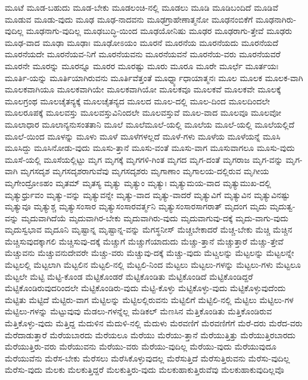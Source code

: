 {ಮೂಟೆ
ಮೂಡ-ಬಹುದು
ಮೂಡ-ಬೇಕು
ಮೂಡಲಂಚಿ-ನಲ್ಲಿ
ಮೂಡಲು
ಮೂಡಿ
ಮೂಡಿಬಂದಿದೆ
ಮೂಡಿವೆ
ಮೂಡುವ
ಮೂಡು-ವುದು
ಮೂಢ
ಮೂಢ-ನಾದವನು
ಮೂಢಗ್ರಾಹೇಣಾತ್ಮನೋ
ಮೂಢನಂಬಿಕೆಗೆ
ಮೂಢನಾಗಿರು-ವುದಿಲ್ಲ
ಮೂಢನಾಗು-ವುದಿಲ್ಲ
ಮೂಢಬುದ್ಧಿ-ಯಿಂದ
ಮೂಢಯೋನಿಷು
ಮೂಢರ
ಮೂಢರಾಗು-ತ್ತೇವೆ
ಮೂಢರು
ಮೂಢ-ವಾದ
ಮೂಢಾ
ಮೂಢಾಃ
ಮೂಢೋಽಯಂ
ಮೂರನೆ
ಮೂರನೆಯ
ಮೂರನೆಯದು
ಮೂರನೆಯದೆ
ಮೂರನೆಯದೇ
ಮೂರನೆಯವ-ನಿಗೆ
ಮೂರನೆಯವನು
ಮೂರನೆಯವನೆ
ಮೂರನೆಯ-ವರು
ಮೂರನೆಯವರೆ
ಮೂರನೇ
ಮೂರನ್ನು
ಮೂರನ್ನೂ
ಮೂರರ
ಮೂರಷ್ಟು
ಮೂರು
ಮೂರೂ
ಮೂರೇ
ಮೂರ್ಛೆ
ಮೂರ್ತಯಃ
ಮೂರ್ತಿ-ಯನ್ನು
ಮೂರ್ತಿಯಾಗಿರುವನು
ಮೂರ್ತಿವೆತ್ತಂತೆ
ಮೂರ್ಧ್ನ್ಯಾಧಾಯಾತ್ಮನಃ
ಮೂಲ
ಮೂಲಕ
ಮೂಲಕ-ವಾಗಿ
ಮೂಲಕವಾಗಿಯೂ
ಮೂಲಕವಾಗಿಯೇ
ಮೂಲಕವಾಗಿಯೋ
ಮೂಲಕವೂ
ಮೂಲಕವೆ
ಮೂಲಕವೇ
ಮೂಲಕ್ಕೆ
ಮೂಲಗ್ರಂಥ
ಮೂಲಚೈತನ್ಯಕ್ಕೆ
ಮೂಲಚೈತನ್ಯದ
ಮೂಲದ
ಮೂಲ-ದಲ್ಲಿ
ಮೂಲ-ದಿಂದ
ಮೂಲದಿಂದಲೇ
ಮೂಲರೂಪಕ್ಕೆ
ಮೂಲವಸ್ತು
ಮೂಲವಸ್ತುವಿನಿಂದಲೇ
ಮೂಲವಸ್ತುವೆ
ಮೂಲ-ವಾದ
ಮೂಲವೂ
ಮೂಲವೋ
ಮೂಲಾಧಾರ
ಮೂಲಾನ್ಯನುಸಂತತಾನಿ
ಮೂಲೆ
ಮೂಲೆಮೂಲೆ-ಯಲ್ಲಿ
ಮೂಲೆಯ
ಮೂಲೆ-ಯಲ್ಲಿ
ಮೂಲೆಯಲ್ಲಿದೆ
ಮೂಲೆ-ಯಿಂದ
ಮೂಳನ್ನು
ಮೂಳು
ಮೂಳೆ
ಮೂಳೆಗಳಲ್ಲದೆ
ಮೂಳೆ-ಗಳು
ಮೂಳೆಯ
ಮೂಳೆಯನ್ನೆ
ಮೂಸಿ
ಮೂಸಿದ್ದು
ಮೂಸಿನೋಡು-ವುದು
ಮೂಸು-ತ್ತಾನೆ
ಮೂಸು-ವಂತೆ
ಮೂಸು-ವಾಗ
ಮೂಸುವಾಗಲೂ
ಮೂಸು-ವುದು
ಮೂಸೆ-ಯಲ್ಲಿ
ಮೂಸೆಯಲ್ಲಿಟ್ಟು
ಮೃಗ
ಮೃಗಕ್ಕೆ
ಮೃಗಗಳಿ-ಗಿಂತ
ಮೃಗದ
ಮೃಗ-ದಂತೆ
ಮೃಗರಾಜ
ಮೃಗ-ವನ್ನು
ಮೃಗ-ವಾಗಿ
ಮೃಗಸದೃಶ
ಮೃಗಸದೃಶರಾಗುವೆವು
ಮೃಗಸದೃಶರು
ಮೃಗಾಣಾಂ
ಮೃಗಾಲಯ-ದಲ್ಲಿರುವ
ಮೃಗೀಯ
ಮೃಗೇಂದ್ರೋಽಹಂ
ಮೃತಮ್
ಮೃತಸ್ಯ
ಮೃತ್ಯು
ಮೃತ್ಯುಂ
ಮೃತ್ಯುಃ
ಮೃತ್ಯುಮಯ-ವಾದ
ಮೃತ್ಯುಮುಖ-ದಲ್ಲಿ
ಮೃತ್ಯುರ್ಧ್ರುವಂ
ಮೃತ್ಯು-ವನ್ನು
ಮೃತ್ಯುವನ್ನೇ
ಮೃತ್ಯು-ವಾದ
ಮೃತ್ಯು-ವಾದರೆ
ಮೃತ್ಯುವಿಗೆ
ಮೃತ್ಯುವಿನ
ಮೃತ್ಯುವಿನಷ್ಟು
ಮೃತ್ಯುವೂ
ಮೃತ್ಯುಶ್ಚ
ಮೃತ್ಯುಸಂಸಾರ
ಮೃತ್ಯುಸಂಸಾರವರ್ತ್ಮನಿ
ಮೃತ್ಯುಸಂಸಾರಸಾಗರಾತ್
ಮೃದಂಗ
ಮೃದು
ಮೃದುತ್ವ-ವನ್ನು
ಮೃದುವಾಗಿದೆಯೆ
ಮೃದುವಾಗಿರ-ಬೇಕು
ಮೃದುವಾಗಿರು-ವುದು
ಮೃದುವಾಗುವು-ದಕ್ಕೆ
ಮೃದು-ವಾಗು-ವುದು
ಮೃದುಸ್ವಭಾವ
ಮೃದೂನಿ
ಮೃಷ್ಟಾನ್ನ
ಮೃಷ್ಟಾನ್ನ-ವನ್ನು
ಮೆಗಸ್ಥನೀಸ್
ಮೆಚ್ಚಬೇಕಾದರೆ
ಮೆಚ್ಚ-ಬೇಕು
ಮೆಚ್ಚಿ
ಮೆಚ್ಚಿನ
ಮೆಚ್ಚಿಸುವುದಕ್ಕಾಗಲಿ
ಮೆಚ್ಚಿಸುವು-ದಕ್ಕೆ
ಮೆಚ್ಚುಗೆ
ಮೆಚ್ಚುಗೆಯಾದುದು
ಮೆಚ್ಚು-ತ್ತಾನೆ
ಮೆಚ್ಚುತ್ತಾರೆ
ಮೆಚ್ಚು-ತ್ತೇವೆ
ಮೆಚ್ಚುವನು
ಮೆಚ್ಚುವನುದೇವರೇ
ಮೆಚ್ಚು-ವರು
ಮೆಚ್ಚುವು-ದಕ್ಕೆ
ಮೆಚ್ಚು-ವುದು
ಮೆಟ್ಚಲನ್ನು
ಮೆಟ್ಟಲನ್ನು
ಮೆಟ್ಟಲನ್ನೇ
ಮೆಟ್ಟಲಲ್ಲಿ
ಮೆಟ್ಟಲಾಗಿ
ಮೆಟ್ಟಲಿನ
ಮೆಟ್ಟಲಿ-ನಲ್ಲಿ
ಮೆಟ್ಟಲಿ-ನಿಂದ
ಮೆಟ್ಟಲು
ಮೆಟ್ಟಲು-ಗಳನ್ನು
ಮೆಟ್ಟಲು-ಗಳು
ಮೆಟ್ಟಲೂ
ಮೆಟ್ಟಲೇ
ಮೆಟ್ಟಿ
ಮೆಟ್ಟಿ-ಕೊಂಡ
ಮೆಟ್ಟಿಕೊಂಡರೆ
ಮೆಟ್ಟಿಕೊಂಡಿತು
ಮೆಟ್ಟಿಕೊಂಡಿದೆ
ಮೆಟ್ಟಿಕೊಂಡಿದ್ದರೆ
ಮೆಟ್ಟಿಕೊಂಡಿರುವುದರಿಂದಲೇ
ಮೆಟ್ಟಿಕೊಂಡಿರು-ವುದು
ಮೆಟ್ಟಿ-ಕೊಳ್ಳು
ಮೆಟ್ಟಿಕೊಳ್ಳು-ವುದು
ಮೆಟ್ಟಿಕೊಳ್ಳುವುದೆಂದು
ಮೆಟ್ಟಿತು
ಮೆಟ್ಟಿದೆ
ಮೆಟ್ಟಿರು-ವಾಗ
ಮೆಟ್ಟಿಲನ್ನು
ಮೆಟ್ಟಿಲಲ್ಲಿರುವನು
ಮೆಟ್ಟಿಲಿಗೆ
ಮೆಟ್ಟಿಲಿ-ನಲ್ಲಿ
ಮೆಟ್ಟಿಲು
ಮೆಟ್ಟಿಲು-ಗಳ
ಮೆಟ್ಟಿಲು-ಗಳನ್ನು
ಮೆಟ್ಟುವುವು
ಮೆಡಲು-ಗಳನ್ನೆಲ್ಲ
ಮೆಡಿಕಲ್
ಮೆಣಸಿನ
ಮೆತ್ತಿಕೊಂಡಿತು
ಮೆತ್ತಿಕೊಂಡಿರುವ
ಮೆತ್ತಿಕೊಳ್ಳು-ವುದು
ಮೆತ್ತಿದ್ದ
ಮೆದುಳಿನ
ಮೆದುಳಿ-ನಲ್ಲಿ
ಮೆದುಳು
ಮೆರವಣಿಗೆ
ಮೆರವಣಿಗೆಗೆ
ಮೆರೆ-ದರು
ಮೆರೆದ-ವರು
ಮೆರೆದಾಡುತ್ತಾರೆ
ಮೆರೆಯಬಾರದು
ಮೆರೆಯಲೂ
ಮೆರೆಯು
ಮೆರೆಯು-ತ್ತಾನೆ
ಮೆರೆಯುತ್ತಿತ್ತು
ಮೆರೆಯುತ್ತಿರಬಾರದು
ಮೆರೆಯುತ್ತಿರು-ವರು
ಮೆರೆಯುವನು
ಮೆರೆಯು-ವರು
ಮೆರೆಯು-ವುದಿಲ್ಲ
ಮೆರೆಯು-ವುದು
ಮೆರೆಯುವುದೂ
ಮೆರೆಯುವೆನು
ಮೆರೆಸ-ಬೇಕು
ಮೆರೆಸಲು
ಮೆರೆಸಿಕೊಳ್ಳುವುದಲ್ಲ
ಮೆರೆಸುತ್ತಿದೆ
ಮೆರೆಸುತ್ತಿರುವನು
ಮೆರೆಸು-ವುದಿಲ್ಲ
ಮೆರೆಸು-ವುದು
ಮೆಲಕು
ಮೆಲಕುತ್ತಿದ್ದರೆ
ಮೆಲಕುತ್ತಿರು-ವುದು
ಮೆಲಕುಹಾಕುತ್ತಿರುವೆವು
ಮೆಲಕುಹಾಕುವುದಿಲ್ಲವೊ
}
